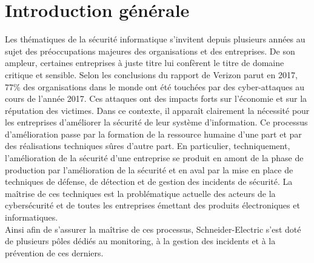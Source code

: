 \documentclass[a4paper,12pt]{book}
\makeatletter
\def\cleardoublepage{\clearpage\if@twoside \ifodd\c@page\else%
  \hbox{}%
  \thispagestyle{empty}%
  \newpage%
  \if@twocolumn\hbox{}\newpage\fi\fi\fi}
\theoremstyle{break}
\makeatother
\begin{document}

\mainmatter
\pagestyle{fancy}

\cleardoublepage

\chapter*{Introduction générale}
\vspace*{-1.1cm}
Les thématiques de la sécurité informatique s’invitent depuis plusieurs années au sujet des préoccupations majeures des organisations et des entreprises. 
De son ampleur, certaines entreprises à juste titre lui confèrent le titre de domaine critique et sensible. 
Selon les conclusions du rapport de Verizon parut en 2017, 77\% des organisations dans le monde ont été touchées par des cyber-attaques au cours de l’année 2017. \newline
Ces attaques ont des impacts forts sur l’économie et sur la réputation des victimes. Dans ce contexte, il apparaît clairement la nécessité pour les entreprises d’améliorer la sécurité de leur système d’information.
Ce processus d’amélioration passe par la formation de la ressource humaine d’une part et par des réalisations techniques sûres d’autre part. \newline
En particulier, techniquement, l’amélioration de la sécurité d’une entreprise se produit en amont de la phase de production par l’amélioration de la sécurité et en aval par la mise en place de techniques de défense, de détection et de gestion des incidents de sécurité.\newline
La maîtrise de ces techniques est la problématique actuelle des acteurs de la cybersécurité et de toutes les entreprises émettant des produits électroniques et informatiques. \\
Ainsi afin de s’assurer la maîtrise de ces processus, Schneider-Electric s'est doté de plusieurs pôles dédiés au monitoring, à la gestion des incidents et à la prévention de ces derniers. 
\end{document}
